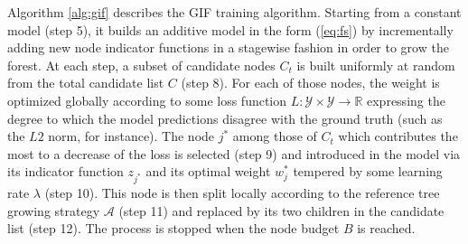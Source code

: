 \documentclass{article}
\DeclareMathOperator*{\argmin}{arg\,min}
\begin{document}


Algorithm \ref{alg:gif} describes the GIF training algorithm.  Starting from a
constant model (step 5), it builds an additive model in the form (\ref{eq:fs})
by incrementally adding new node indicator functions in a stagewise fashion in
order to grow the forest.  At each step, a subset of candidate nodes $C_t$ is
built uniformly at random from the total candidate list $C$ (step 8). 
For each of those nodes, the weight is optimized globally according to some 
loss function $L: \mathcal{Y} \times \mathcal{Y} \rightarrow \mathbb{R}$ 
expressing the degree to which the model predictions disagree with the ground 
truth (such as the $L2$ norm, for instance).
The node $j^*$ among those of $C_t$ which contributes the most to a decrease of 
the loss is selected (step 9) and introduced in the model via its indicator 
function $z_{j^*}$ and its optimal weight $w^*_j$ tempered by some learning 
rate $\lambda$ (step 10). This node is then split locally according to the 
reference tree growing strategy $\mathcal{A}$ (step 11) and replaced by its two 
children in the candidate list (step 12). The process is stopped when the node 
budget $B$ is reached.
\end{document}

